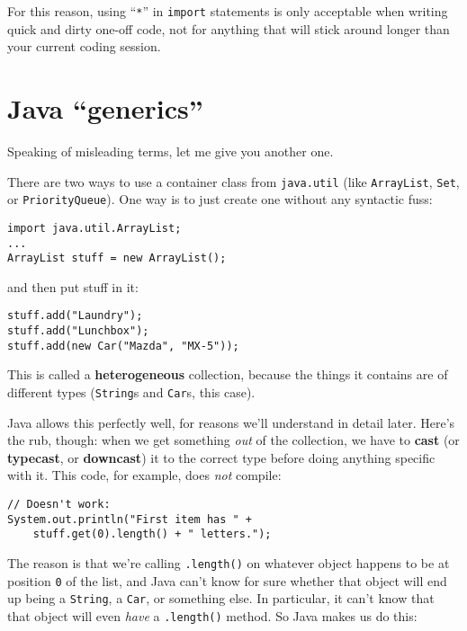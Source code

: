 For this reason, using ``\texttt{*}'' in \texttt{import} statements is only
acceptable when writing quick and dirty one-off code, not for anything that
will stick around longer than your current coding session.



\section{Java ``generics''}
\label{sec:generics}

Speaking of misleading terms, let me give you another one.

There are two ways to use a container class from \texttt{java.util} (like
\texttt{ArrayList}, \texttt{Set}, or \texttt{PriorityQueue}). One way is to
just create one without any syntactic fuss:

\begin{Verbatim}[fontsize=\small,samepage=true,frame=single]
import java.util.ArrayList;
...
ArrayList stuff = new ArrayList();
\end{Verbatim}

and then put stuff in it:

\begin{Verbatim}[fontsize=\small,samepage=true,frame=single]
stuff.add("Laundry");
stuff.add("Lunchbox");
stuff.add(new Car("Mazda", "MX-5"));
\end{Verbatim}

This is called a \textbf{heterogeneous} collection, because the things it
contains are of different types (\texttt{String}s and \texttt{Car}s, this
case).

Java allows this perfectly well, for reasons we'll understand in detail later.
Here's the rub, though: when we get something \textit{out} of the collection,
we have to \textbf{cast} (or \textbf{typecast}, or \textbf{downcast}) it to
the correct type before doing anything specific with it. This code, for
example, does \textit{not} compile:

\begin{Verbatim}[fontsize=\small,samepage=true]
// Doesn't work:
System.out.println("First item has " +
    stuff.get(0).length() + " letters.");
\end{Verbatim}

The reason is that we're calling \texttt{.length()} on whatever object happens
to be at position \texttt{0} of the list, and Java can't know for sure whether
that object will end up being a \texttt{String}, a \texttt{Car}, or something
else. In particular, it can't know that that object will even \textit{have} a
\texttt{.length()} method. So Java makes us do this:

